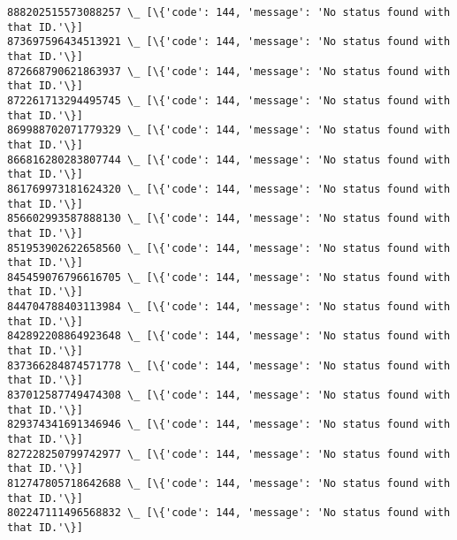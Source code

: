 \documentclass[11pt]{article}
\begin{document}
    \begin{Verbatim}[commandchars=\\\{\}]
888202515573088257 \_ [\{'code': 144, 'message': 'No status found with that ID.'\}]
873697596434513921 \_ [\{'code': 144, 'message': 'No status found with that ID.'\}]
872668790621863937 \_ [\{'code': 144, 'message': 'No status found with that ID.'\}]
872261713294495745 \_ [\{'code': 144, 'message': 'No status found with that ID.'\}]
869988702071779329 \_ [\{'code': 144, 'message': 'No status found with that ID.'\}]
866816280283807744 \_ [\{'code': 144, 'message': 'No status found with that ID.'\}]
861769973181624320 \_ [\{'code': 144, 'message': 'No status found with that ID.'\}]
856602993587888130 \_ [\{'code': 144, 'message': 'No status found with that ID.'\}]
851953902622658560 \_ [\{'code': 144, 'message': 'No status found with that ID.'\}]
845459076796616705 \_ [\{'code': 144, 'message': 'No status found with that ID.'\}]
844704788403113984 \_ [\{'code': 144, 'message': 'No status found with that ID.'\}]
842892208864923648 \_ [\{'code': 144, 'message': 'No status found with that ID.'\}]
837366284874571778 \_ [\{'code': 144, 'message': 'No status found with that ID.'\}]
837012587749474308 \_ [\{'code': 144, 'message': 'No status found with that ID.'\}]
829374341691346946 \_ [\{'code': 144, 'message': 'No status found with that ID.'\}]
827228250799742977 \_ [\{'code': 144, 'message': 'No status found with that ID.'\}]
812747805718642688 \_ [\{'code': 144, 'message': 'No status found with that ID.'\}]
802247111496568832 \_ [\{'code': 144, 'message': 'No status found with that ID.'\}]
    \end{Verbatim}
\end{document}
